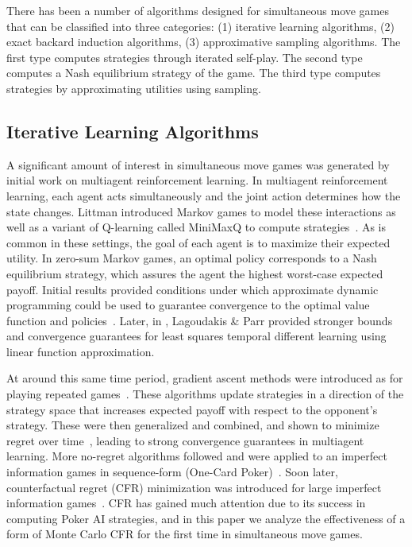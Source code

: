 There has been a number of algorithms designed for simultaneous move games that can be classified into three categories: 
(1) iterative learning algorithms, 
(2) exact backard induction algorithms, 
(3) approximative sampling algorithms.
The first type computes strategies through iterated self-play.
The second type computes a Nash equilibrium strategy of the game. 
The third type computes strategies by approximating utilities using sampling. 

\subsection{Iterative Learning Algorithms}



A significant amount of interest in simultaneous move games was generated by initial work 
on multiagent reinforcement learning. In multiagent reinforcement learning, each agent acts simultaneously and 
the joint action determines how the state changes. Littman introduced Markov games to model these interactions 
as well as a variant of Q-learning called MiniMaxQ to compute strategies~\cite{Littman94markovgames,Littman01Value}.
As is common in these settings, the goal of each agent is to maximize their expected utility. 
In zero-sum Markov games, an optimal policy corresponds to a Nash equilibrium strategy, which assures the agent 
the highest worst-case expected payoff. Initial results provided conditions under which approximate dynamic 
programming could be used to guarantee convergence to the optimal value function and 
policies~\cite{Littman96ageneralized}. Later, in \cite{Lagoudakis02}, Lagoudakis \& Parr provided stronger bounds 
and convergence guarantees for least squares temporal different learning using linear function approximation. 

At around this same time period, gradient ascent methods were introduced as for playing 
repeated games~\cite{Singh20Nash,Bowling01WoLF}. These algorithms update strategies in a direction of the strategy space 
that increases expected payoff with respect to the opponent's strategy. These were then generalized and combined, and 
shown to minimize regret over time~\cite{Zinkevich03Online,Bowling05Convergence}, leading to strong convergence 
guarantees in multiagent learning. More no-regret algorithms followed and were applied to an imperfect information 
games in sequence-form (One-Card Poker)~\cite{Gordon06No}. Soon later, counterfactual regret (CFR) minimization was 
introduced for large imperfect information games~\cite{CFR}. CFR has gained much attention due to its success in 
computing Poker AI strategies, and in this paper we analyze the effectiveness of a form of Monte Carlo CFR for the 
first time in simultaneous move games. 

